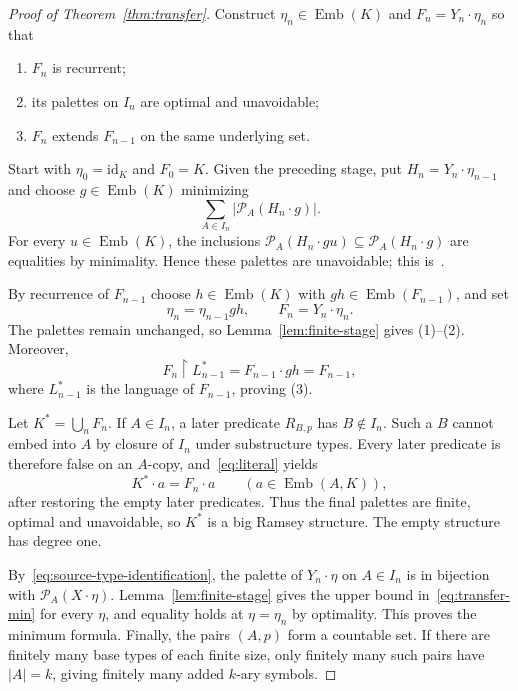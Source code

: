 \documentclass{article}
\numberwithin{equation}{section}
\theoremstyle{definition}
\DeclareMathOperator{\Emb}{Emb}
\newcommand{\res}{\mathbin{\upharpoonright}}
\begin{document}
\begin{proof}[Proof of Theorem~\ref{thm:transfer}]
Construct $\eta_n\in\Emb(K)$ and $F_n=Y_n\cdot\eta_n$ so that
\begin{enumerate}
\item $F_n$ is recurrent;
\item its palettes on $I_n$ are optimal and unavoidable;
\item $F_n$ extends $F_{n-1}$ on the same underlying set.
\end{enumerate}
Start with $\eta_0=\mathrm{id}_K$ and $F_0=K$. Given the preceding
stage, put $H_n=Y_n\cdot\eta_{n-1}$ and choose $g\in\Emb(K)$
minimizing
\begin{equation}\label{eq:minsum}
\sum_{A\in I_n}|\mathcal P_A(H_n\cdot g)|.
\end{equation}
For every $u\in\Emb(K)$, the inclusions
$\mathcal P_A(H_n\cdot gu)\subseteq\mathcal P_A(H_n\cdot g)$
are equalities by minimality. Hence these palettes are unavoidable;
this is~\cite[Fact~3.4(2)]{HZ}.

By recurrence of $F_{n-1}$ choose $h\in\Emb(K)$ with
$gh\in\Emb(F_{n-1})$, and set
\[
\eta_n=\eta_{n-1}gh,\qquad F_n=Y_n\cdot\eta_n.
\]
The palettes remain unchanged, so Lemma~\ref{lem:finite-stage} gives
(1)--(2). Moreover,
\begin{equation}\label{eq:literal}
F_n\res L_{n-1}^*=F_{n-1}\cdot gh=F_{n-1},
\end{equation}
where $L_{n-1}^*$ is the language of $F_{n-1}$, proving (3).

Let $K^*=\bigcup_nF_n$. If $A\in I_n$, a later predicate $R_{B,p}$
has $B\notin I_n$. Such a $B$ cannot embed into $A$ by closure of
$I_n$ under substructure types. Every later predicate is therefore
false on an $A$-copy, and~\eqref{eq:literal} yields
\begin{equation}\label{eq:final-type-identity}
K^*\cdot a=F_n\cdot a\qquad(a\in\Emb(A,K)),
\end{equation}
after restoring the empty later predicates. Thus the final palettes
are finite, optimal and unavoidable, so $K^*$ is a big Ramsey structure.
The empty structure has degree one.

By~\eqref{eq:source-type-identification}, the palette of
$Y_n\cdot\eta$ on $A\in I_n$ is in bijection with
$\mathcal P_A(X\cdot\eta)$. Lemma~\ref{lem:finite-stage} gives the
upper bound in~\eqref{eq:transfer-min} for every $\eta$, and equality
holds at $\eta=\eta_n$ by optimality. This proves the minimum formula.
Finally, the pairs $(A,p)$ form a countable set. If there are finitely
many base types of each finite size, only finitely many such pairs
have $|A|=k$, giving finitely many added $k$-ary symbols.
\end{proof}
\end{document}
